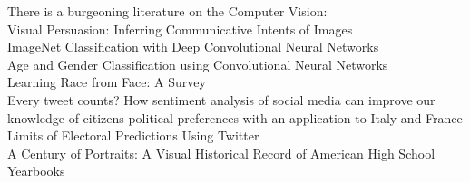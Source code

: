 \documentclass[letterpaper]{article}
\begin{document}
There is a burgeoning literature on the 
Computer Vision:\\
Visual Persuasion: Inferring Communicative Intents of Images\\
ImageNet Classification with Deep Convolutional Neural Networks\\
Age and Gender Classification using Convolutional Neural Networks\\
Learning Race from Face: A Survey\\
Every tweet counts? How sentiment analysis of social media can improve our knowledge of citizens political preferences with an application to Italy and France\\
Limits of Electoral Predictions Using Twitter\\
A Century of Portraits: A Visual Historical Record of American High School Yearbooks\\
\fi




\end{document}
